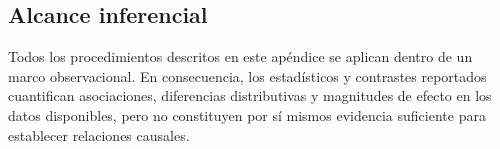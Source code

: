 \documentclass[8pt,a4paper]{article} %
\numberwithin{figure}{subsection}
\begin{document}
\subsection{Alcance inferencial}
Todos los procedimientos descritos en este apéndice se aplican dentro de un marco observacional. En consecuencia, los estadísticos y contrastes reportados cuantifican asociaciones, diferencias distributivas y magnitudes de efecto en los datos disponibles, pero no constituyen por sí mismos evidencia suficiente para establecer relaciones causales.
\end{document}
